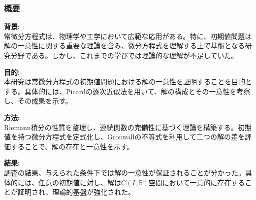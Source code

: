 \documentclass{beamer}
\begin{document}
\begin{frame}
\frametitle{概要}

\textbf{背景:}\\
常微分方程式は、物理学や工学において広範な応用がある。特に、初期値問題は解の一意性に関する重要な理論を含み、微分方程式を理解する上で基盤となる研究分野である。しかし、これまでの学びでは理論的な理解が不足していた。

\vspace{0.5em}
\textbf{目的:}\\
本研究は常微分方程式の初期値問題における解の一意性を証明することを目的とする。具体的には、Picardの逐次近似法を用いて、解の構成とその一意性を考察し、その成果を示す。

\vspace{0.5em}
\textbf{方法:}\\
Riemann積分の性質を整理し、連続関数の完備性に基づく理論を構築する。初期値を持つ微分方程式を定式化し、Gronwallの不等式を利用して二つの解の差を評価することで、解の存在と一意性を示す。

\vspace{0.5em}
\textbf{結果:}\\
調査の結果、与えられた条件下では解の一意性が保証されることが分かった。具体的には、任意の初期値に対し、解は$C(I, \mathbb{R})$空間において一意的に存在することが証明され、理論的基盤が強化された。

\end{frame}
\end{document}
